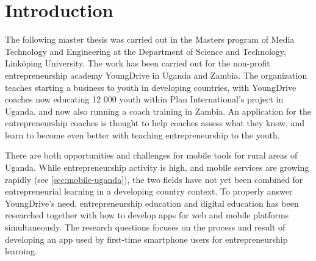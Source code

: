\chapter{Introduction}\label{cha:intro}



The following master thesis was carried out in the Masters program of Media Technology and Engineering at the Department of Science and Technology, Linköping University. The work has been carried out for the non-profit entrepreneurship academy YoungDrive in Uganda and Zambia. The organization teaches starting a business to youth in developing countries, with YoungDrive coaches now educating 12 000 youth within Plan International's project in Uganda, and now also running a coach training in Zambia. An application for the entrepreneurship coaches is thought to help coaches assess what they know, and learn to become even better with teaching entrepreneurship to the youth.

There are both opportunities and challenges for mobile tools for rural areas of Uganda. While entrepreneurship activity is high, and mobile services are growing rapidly (see \ref{sec:mobile-uganda}), the two fields have not yet been combined for entrepreneurial learning in a developing country context. To properly answer YoungDrive's need, entrepreneurship education and digital education has been researched together with how to develop apps for web and mobile platforms simultaneously. The research questions focuses on the process and result of developing an app used by first-time smartphone users for entrepreneurship learning.



% 

%





%

%

%

